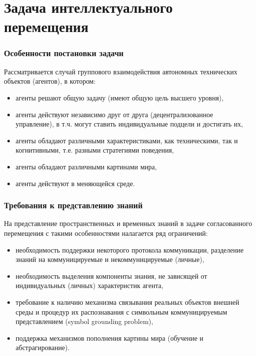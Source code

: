 \documentclass[default]{beamer}
\begin{document}
	\section{Задача интеллектуального перемещения}
	\begin{frame}
		\frametitle{Особенности постановки задачи}
		
		Рассматривается случай группового взаимодействия автономных технических объектов (агентов), в котором:
		\begin{itemize}
			\item агенты решают общую задачу (имеют общую цель высшего уровня),
			\item агенты действуют независимо друг от друга (децентрализованное управление), в т.ч. могут ставить индивидуальные подцели и достигать их,
			\item агенты обладают различными характеристиками, как техническими, так и когнитивными, т.е. разными стратегиями поведения,
			\item агенты обладают различными картинами мира,
			\item агенты действуют в меняющейся среде.
		\end{itemize}
		
	\end{frame}
	
	\begin{frame}
		\frametitle{Требования к представлению знаний}
		
		На представление пространственных и временных знаний в задаче согласованного перемещения с такими особенностями налагается ряд ограничений:
		\begin{itemize}
			\item необходимость поддержки некоторого протокола коммуникации, разделение знаний на коммуницируемые и некоммуницируемые (личные),
			\item необходимость выделения компоненты знания, не зависящей от индивидуальных (личных) характеристик агента,
			\item требование к наличию механизма связывания реальных объектов внешней среды и процедур их распознавания с символьным коммуницируемым представлением (symbol grounding problem),
			\item поддержка механизмов пополнения картины мира (обучение и абстрагирование).
		\end{itemize}
	\end{frame}
		
\end{document}
